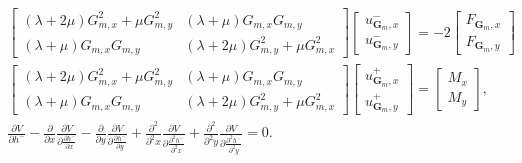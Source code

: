 \documentclass[aps,prx,10pt,twocolumn,superscriptaddress]{revtex4}
\begin{document}
\begin{widetext}
\begin{align}
\begin{split}
&\left[\begin{array}{cc}
				(\lambda+2\mu)G^{2}_{m,x}+\mu G^{2}_{m,y} & (\lambda+\mu)G_{m,x}G_{m,y} \\
				(\lambda+\mu)G_{m,x}G_{m,y} & (\lambda+2\mu)G^{2}_{m,y}+\mu G^{2}_{m,x}
\end{array}\right]\left[\begin{array}{c}
                     u^{-}_{\textbf{G}_{m},x}\\
                     u^{-}_{\textbf{G}_{m},y}
\end{array}\right]=-2\left[\begin{array}{c}
                     F_{\textbf{G}_{m},x}\\
                     F_{\textbf{G}_{m},y}
\end{array}\right]\\
&\left[\begin{array}{cc}
				(\lambda+2\mu)G^{2}_{m,x}+\mu G^{2}_{m,y} & (\lambda+\mu)G_{m,x}G_{m,y} \\
				(\lambda+\mu)G_{m,x}G_{m,y} & (\lambda+2\mu)G^{2}_{m,y}+\mu G^{2}_{m,x}
\end{array}\right]\left[\begin{array}{c}
                     u^{+}_{\textbf{G}_{m},x}\\
                     u^{+}_{\textbf{G}_{m},y}
\end{array}\right]=\left[\begin{array}{c}
                     M_{x}\\
                     M_{y}
\end{array}\right],\\
&\frac{\partial V}{\partial h^{-}}-\frac{\partial}{\partial x}\frac{\partial V}{\partial \frac{\partial h^{-}}{\partial x}}-\frac{\partial}{\partial y}\frac{\partial V}{\partial \frac{\partial h^{-}}{\partial y}}+\frac{\partial^{2}}{\partial^{2} x}\frac{\partial V}{\partial \frac{\partial^{2} h^{-}}{\partial^{2} x}}+\frac{\partial^{2}}{\partial^{2} y}\frac{\partial V}{\partial \frac{\partial^{2} h^{-}}{\partial^{2} y}}=0.
\end{split}
\end{align}
\end{widetext}
\end{document}

